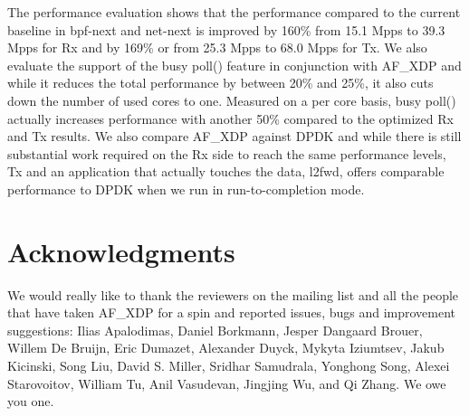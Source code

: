 \documentclass[9pt,numbers,reprint]{sigplanconf}
\begin{document}
The performance evaluation shows that the performance compared to the
current baseline in bpf-next and net-next is improved by 160\% from
15.1 Mpps to 39.3 Mpps for Rx and by 169\% or from 25.3 Mpps to 68.0
Mpps for Tx. We also evaluate the support of the busy poll() feature
in conjunction with AF\_XDP and while it reduces the total performance
by between 20\% and 25\%, it also cuts down the number of used cores
to one. Measured on a per core basis, busy poll() actually increases
performance with another 50\% compared to the optimized Rx and Tx
results. We also compare AF\_XDP against DPDK and while there is still
substantial work required on the Rx side to reach the same performance
levels, Tx and an application that actually touches the data, l2fwd,
offers comparable performance to DPDK when we run in run-to-completion
mode.


\section{Acknowledgments}
\label{sec:thanks}

We would really like to thank the reviewers on the mailing list and
all the people that have taken AF\_XDP for a spin and reported issues,
bugs and improvement suggestions: Ilias Apalodimas, Daniel Borkmann,
Jesper Dangaard Brouer, Willem De Bruijn, Eric Dumazet, Alexander
Duyck, Mykyta Iziumtsev, Jakub Kicinski, Song Liu, David S. Miller,
Sridhar Samudrala, Yonghong Song, Alexei Starovoitov, William Tu, Anil
Vasudevan, Jingjing Wu, and Qi Zhang. We owe you one.



\end{document}
